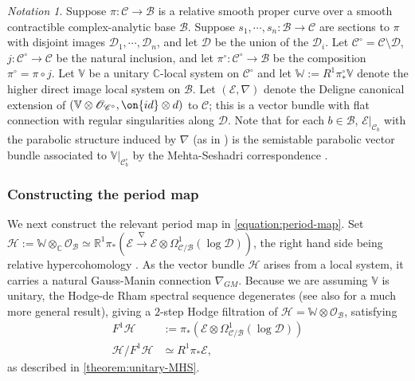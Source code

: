 \documentclass[12 pt]{amsart}
\theoremstyle{plain}
\theoremstyle{definition}
\theoremstyle{remark}
\newtheorem{notation}[subsubsection]{Notation}
\numberwithin{equation}{section}
\begin{document}
\begin{notation}
	\label{notation:period-map}
	Suppose $\pi: \mathscr{C} \to \mathscr{B}$ is a relative smooth proper curve over a smooth
	contractible complex-analytic base $\mathscr{B}$. Suppose $s_1, \cdots,
	s_n: \mathscr{B}\to \mathscr{C}$ are sections to $\pi$ with disjoint
	images $\mathscr{D}_1, \cdots, \mathscr{D}_n$, and let $\mathscr{D}$ be
	the union of the $\mathscr{D}_i$. Let
	$\mathscr{C}^\circ=\mathscr{C}\setminus \mathscr{D}$,
	$j:\mathscr{C}^\circ\to \mathscr{C}$ be the natural inclusion, and let $\pi^\circ: \mathscr{C}^\circ \to \mathscr{B}$ be the composition $\pi^\circ=\pi\circ j$.
Let $\mathbb V$ be a unitary $\mathbb C$-local system on $\mathscr{C}^\circ$ and
let 
$\mathbb{W}:=R^1 \pi^\circ_* \mathbb V$ denote the higher direct image local system on $\mathscr{B}$.
Let $(\mathscr E, \nabla)$ denote the Deligne canonical extension 
\cite[Remarques 5.5(i)]{deligne:regular-singular}
of $(\mathbb{V}\otimes \mathscr{O}_{\mathscr{C}^\circ}, \on{id}\otimes d)$ to $\mathscr{C}$; this is a vector bundle with flat connection with regular singularities along $\mathscr{D}$. Note that for each $b\in \mathscr{B}$, $\mathscr{E}|_{\mathscr{C}_b}$ with the parabolic structure induced by $\nabla$ (as in \cite[Definition 3.3.1]{LL:geometric-local-systems}) is the semistable parabolic vector bundle associated to $\mathbb{V}|_{\mathscr{C}_b^\circ}$ by the Mehta-Seshadri correspondence \cite{mehta1980moduli, simpson1990harmonic}.

\end{notation}

\subsubsection{Constructing the period map}
\label{subsubsection:constructing-period-map}
We next construct the relevant period map in \eqref{equation:period-map}.
Set $\mathscr H:=\mathbb{W} \otimes_{\mathbb C}
\mathscr O_\mathscr{B} \simeq  \mathbb R^1
\pi_*( \mathscr E \overset{\nabla}{\to} \mathscr E \otimes \Omega^1_{\mathscr{C}/\mathscr{B}}(\log \mathscr{D}))$, the
right hand side being
relative hypercohomology \cite[Corollaire 6.10, Proposition 6.14]{deligne:regular-singular}.
As the vector bundle $\mathscr{H}$ arises from a local system, it carries a natural Gauss-Manin connection $\nabla_{GM}$.
Because we are assuming $\mathbb V$ is unitary, the Hodge-de Rham spectral sequence
degenerates \cite[Theorem 7.1(a)]{timmerscheidt:mixed-hodge-structure-for-unitary} (see also \cite[Th\'eor\`eme 5.3.1]{saito1988modules} for a much more general result), 
giving a $2$-step Hodge filtration of 
$\mathscr H = \mathbb W \otimes \mathscr O_\mathscr{B}$, satisfying
\begin{equation}
	\label{equation:h-filtration}
\begin{aligned}
F^1 \mathscr H &:= \pi_* (\mathscr E \otimes
\Omega^1_{\mathscr{C}/\mathscr{B}}(\log\mathscr{D})) \\
\mathscr H/ F^1 \mathscr H &\simeq R^1 \pi_* \mathscr E,
\end{aligned}
\end{equation}
as described in \autoref{theorem:unitary-MHS}.
\end{document}
